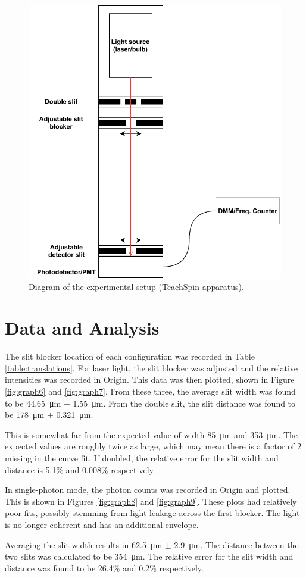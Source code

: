 \documentclass[notitlepage]{report}
\begin{document}
	\begin{figure}[H]
		\centering
		\includegraphics[width=0.5\linewidth]{setup}
		\caption{Diagram of the experimental setup (TeachSpin apparatus).}
		\label{fig:setup}
	\end{figure}
	
	\section{Data and Analysis}
	The slit blocker location of each configuration was recorded in Table \ref{table:translations}. For laser light, the slit blocker was adjusted and the relative intensities was recorded in Origin. This data was then plotted, shown in Figure \ref{fig:graph6} and \ref{fig:graph7}. From these three, the average slit width was found to be \SI{44.65}{\um} $\pm$ \SI{1.55}{\um}. From the double slit, the slit distance was found to be \SI{178}{\um} $\pm$ \SI{0.321}{\um}. 
	
	This is somewhat far from the expected value of width \SI{85}{\um} and \SI{353}{\um}. The expected values are roughly twice as large, which may mean there is a factor of $2$ missing in the curve fit. If doubled, the relative error for the slit width and distance is 5.1\% and 0.008\% respectively.
	
	In single-photon mode, the photon counts was recorded in Origin and plotted. This is shown in Figures \ref{fig:graph8} and \ref{fig:graph9}. These plots had relatively poor fits, possibly stemming from light leakage across the first blocker. The light is no longer coherent and has an additional envelope. 
	
	Averaging the slit width results in \SI{62.5}{\um} $\pm$ \SI{2.9}{\um}. The distance between the two slits was calculated to be \SI{354}{\um}. The relative error for the slit width and distance was found to be 26.4\% and 0.2\% respectively.
	
\end{document}
